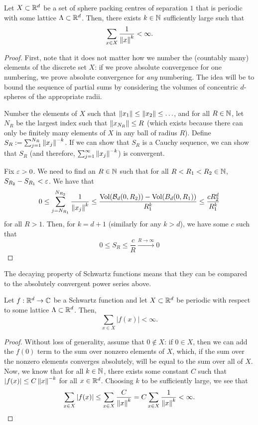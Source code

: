 \begin{lemma}
  Let $X \subset \mathbb{R}^d$ be a set of sphere packing centres of separation $1$ that is periodic with some lattice $\Lambda \subset \mathbb{R}^d$. Then, there exists $k \in \mathbb{N}$ sufficiently large such that
  \[
    \sum_{x \in X} \frac{1}{\left\lVert x \right\rVert^{k}} < \infty.
  \]
\end{lemma}
\begin{proof}
  First, note that it does not matter how we number the (countably many) elements of the discrete set $X$: if we prove absolute convergence for one numbering, we prove absolute convergence for \emph{any} numbering. The idea will be to bound the sequence of partial sums by considering the volumes of concentric $d$-spheres of the appropriate radii.

  Number the elements of $X$ such that $\left\lVert x_1 \right\rVert \leq \left\lVert x_2 \right\rVert \leq \ldots$, and for all $R \in \mathbb{N}$, let $N_R$ be the largest index such that $\left\lVert x_{N_R} \right\rVert \leq R$ (which exists because there can only be finitely many elements of $X$ in any ball of radius $R$). Define $S_R := \sum_{j=1}^{N_R} \left\lVert x_j \right\rVert^{-k}$. If we can show that $S_R$ is a Cauchy sequence, we can show that $S_R$ (and therefore, $\sum_{j=1}^{\infty} \left\lVert x_j \right\rVert^{-k}$) is convergent.

  Fix $\varepsilon > 0$. We need to find an $R \in \mathbb{N}$ such that for all $R < R_1 < R_2 \in \mathbb{N}$, $S_{R_2} - S_{R_1} < \varepsilon$. We have that
  \[
    0 \leq \sum_{j=N_{R_1}}^{N_{R_2}} \frac{1}{\left\lVert x_j \right\rVert^k} \leq \frac{\operatorname{Vol}\!\left(\mathcal{B}_d(0, R_2)\right) - \operatorname{Vol}\!\left(B_d(0, R_1)\right)}{R_1^k} \leq \frac{c R_2^{d}}{R_1^k}
  \]
  for all $R > 1$. Then, for $k = d + 1$ (similarly for any $k > d$), we have some $c$ such that
  \[
    0 \leq S_R \leq \frac{c}{R} \xrightarrow{R \to \infty} 0
  \]
\end{proof}

The decaying property of Schwartz functions means that they can be compared to the absolutely convergent power series above.

\begin{lemma}
  Let $f : \mathbb{R}^d \to \mathbb{C}$ be a Schwartz function and let $X \subset \mathbb{R}^d$ be periodic with respect to some lattice $\Lambda \subset \mathbb{R}^d$. Then,
  \[
    \sum_{x \in X} |f(x)| < \infty.
  \]
\end{lemma}
\begin{proof}
  Without loss of generality, assume that $0 \notin X$: if $0 \in X$, then we can add the $f(0)$ term to the sum over nonzero elements of $X$, which, if the sum over the nonzero elements converges absolutely, will be equal to the sum over all of $X$. Now, we know that for all $k \in \mathbb{N}$, there exists some constant $C$ such that $|f(x)| \leq C\left\lVert x \right\rVert^{-k}$ for all $x \in \mathbb{R}^d$. Choosing $k$ to be sufficiently large, we see that
  \[
    \sum_{x \in X} |f(x)| \leq \sum_{x \in X} \frac{C}{\left\lVert x \right\rVert^{k}} = C \sum_{x \in X} \frac{1}{\left\lVert x \right\rVert^k} < \infty.
  \]
\end{proof}

